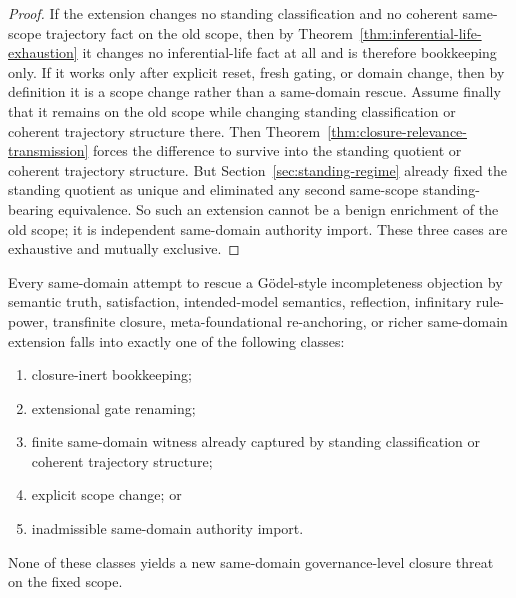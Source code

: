\begin{proof}
If the extension changes no standing classification and no coherent same-scope trajectory fact on the old scope, then by Theorem~\ref{thm:inferential-life-exhaustion} it changes no inferential-life fact at all and is therefore bookkeeping only. If it works only after explicit reset, fresh gating, or domain change, then by definition it is a scope change rather than a same-domain rescue. Assume finally that it remains on the old scope while changing standing classification or coherent trajectory structure there. Then Theorem~\ref{thm:closure-relevance-transmission} forces the difference to survive into the standing quotient or coherent trajectory structure. But Section~\ref{sec:standing-regime} already fixed the standing quotient as unique and eliminated any second same-scope standing-bearing equivalence. So such an extension cannot be a benign enrichment of the old scope; it is independent same-domain authority import. These three cases are exhaustive and mutually exclusive.
\end{proof}

\begin{theorem}
\label{thm:rescue-route-exhaustion}
Every same-domain attempt to rescue a G\"odel-style incompleteness objection by semantic truth, satisfaction, intended-model semantics, reflection, infinitary rule-power, transfinite closure, meta-foundational re-anchoring, or richer same-domain extension falls into exactly one of the following classes:
\begin{enumerate}
  \item closure-inert bookkeeping;
  \item extensional gate renaming;
  \item finite same-domain witness already captured by standing classification or coherent trajectory structure;
  \item explicit scope change; or
  \item inadmissible same-domain authority import.
\end{enumerate}
None of these classes yields a new same-domain governance-level closure threat on the fixed scope.
\end{theorem}

